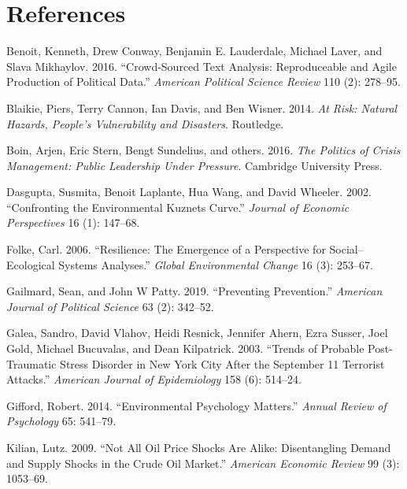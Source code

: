 \documentclass[]{article}
\begin{document}
\hypertarget{references}{%
\section*{References}\label{references}}

\hypertarget{refs}{}
\leavevmode\hypertarget{ref-benoitetal2016}{}%
Benoit, Kenneth, Drew Conway, Benjamin E. Lauderdale, Michael Laver, and Slava Mikhaylov. 2016. ``Crowd-Sourced Text Analysis: Reproduceable and Agile Production of Political Data.'' \emph{American Political Science Review} 110 (2): 278--95.

\leavevmode\hypertarget{ref-blaikie2014risk}{}%
Blaikie, Piers, Terry Cannon, Ian Davis, and Ben Wisner. 2014. \emph{At Risk: Natural Hazards, People's Vulnerability and Disasters}. Routledge.

\leavevmode\hypertarget{ref-boin2016politics}{}%
Boin, Arjen, Eric Stern, Bengt Sundelius, and others. 2016. \emph{The Politics of Crisis Management: Public Leadership Under Pressure}. Cambridge University Press.

\leavevmode\hypertarget{ref-dasgupta2002confronting}{}%
Dasgupta, Susmita, Benoit Laplante, Hua Wang, and David Wheeler. 2002. ``Confronting the Environmental Kuznets Curve.'' \emph{Journal of Economic Perspectives} 16 (1): 147--68.

\leavevmode\hypertarget{ref-folke2006resilience}{}%
Folke, Carl. 2006. ``Resilience: The Emergence of a Perspective for Social--Ecological Systems Analyses.'' \emph{Global Environmental Change} 16 (3): 253--67.

\leavevmode\hypertarget{ref-gailmard2019preventing}{}%
Gailmard, Sean, and John W Patty. 2019. ``Preventing Prevention.'' \emph{American Journal of Political Science} 63 (2): 342--52.

\leavevmode\hypertarget{ref-galea2003trends}{}%
Galea, Sandro, David Vlahov, Heidi Resnick, Jennifer Ahern, Ezra Susser, Joel Gold, Michael Bucuvalas, and Dean Kilpatrick. 2003. ``Trends of Probable Post-Traumatic Stress Disorder in New York City After the September 11 Terrorist Attacks.'' \emph{American Journal of Epidemiology} 158 (6): 514--24.

\leavevmode\hypertarget{ref-gifford2014environmental}{}%
Gifford, Robert. 2014. ``Environmental Psychology Matters.'' \emph{Annual Review of Psychology} 65: 541--79.

\leavevmode\hypertarget{ref-kilian2009not}{}%
Kilian, Lutz. 2009. ``Not All Oil Price Shocks Are Alike: Disentangling Demand and Supply Shocks in the Crude Oil Market.'' \emph{American Economic Review} 99 (3): 1053--69.
\end{document}
